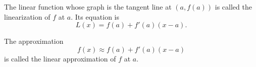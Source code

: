 \begin{frame}
\begin{definition}[Linearization of $f$ at $a$]
The linear function whose graph is the tangent line at $(a,f(a))$ is called the linearization of $f$ at $a$.  Its equation is
\[
L(x) = f(a) + f'(a)(x-a).
\]
\end{definition}
\begin{definition}
The approximation
\[
f(x) \approx f(a) + f'(a)(x-a)
\]
is called the linear approximation of $f$ at $a$.
\end{definition}
\end{frame}
